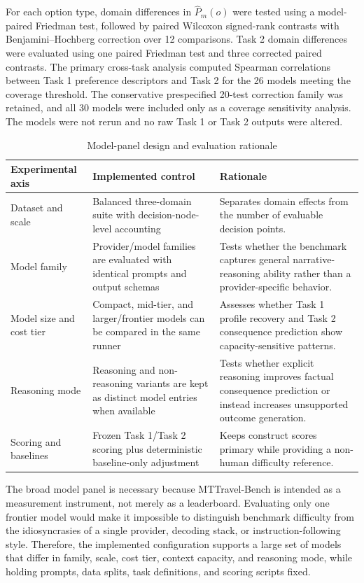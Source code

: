 \documentclass[pdflatex,sn-mathphys-num]{sn-jnl}%
\theoremstyle{thmstyleone}%
\theoremstyle{thmstyletwo}%
\theoremstyle{thmstylethree}%
\begin{document}
For each option type, domain differences in $\widehat P_m(o)$ were tested using a model-paired Friedman test, followed by paired Wilcoxon signed-rank contrasts with Benjamini--Hochberg correction over 12 comparisons. Task 2 domain differences were evaluated using one paired Friedman test and three corrected paired contrasts. The primary cross-task analysis computed Spearman correlations between Task 1 preference descriptors and Task 2 for the 26 models meeting the coverage threshold. The conservative prespecified 20-test correction family was retained, and all 30 models were included only as a coverage sensitivity analysis. The models were not rerun and no raw Task 1 or Task 2 outputs were altered.
\begin{table}[htbp]
\centering
\small
\caption{Model-panel design and evaluation rationale}
\label{tab:model-panel-design-and-evaluation-ration}
\begin{tabular}{p{}p{}p{}}
\toprule
Experimental axis & Implemented control & Rationale \\
\midrule
Dataset and scale & Balanced three-domain suite with decision-node-level accounting & Separates domain effects from the number of evaluable decision points. \\
Model family & Provider/model families are evaluated with identical prompts and output schemas & Tests whether the benchmark captures general narrative-reasoning ability rather than a provider-specific behavior. \\
Model size and cost tier & Compact, mid-tier, and larger/frontier models can be compared in the same runner & Assesses whether Task 1 profile recovery and Task 2 consequence prediction show capacity-sensitive patterns. \\
Reasoning mode & Reasoning and non-reasoning variants are kept as distinct model entries when available & Tests whether explicit reasoning improves factual consequence prediction or instead increases unsupported outcome generation. \\
Scoring and baselines & Frozen Task 1/Task 2 scoring plus deterministic baseline-only adjustment & Keeps construct scores primary while providing a non-human difficulty reference. \\
\bottomrule
\end{tabular}
\end{table}

The broad model panel is necessary because MTTravel-Bench is intended as a measurement instrument, not merely as a leaderboard. Evaluating only one frontier model would make it impossible to distinguish benchmark difficulty from the idiosyncrasies of a single provider, decoding stack, or instruction-following style. Therefore, the implemented configuration supports a large set of models that differ in family, scale, cost tier, context capacity, and reasoning mode, while holding prompts, data splits, task definitions, and scoring scripts fixed.
\end{document}
